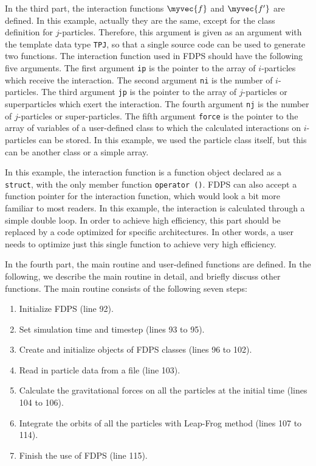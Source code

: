 In the third part, the interaction functions $\myvec{f}$ and
$\myvec{f'}$ are defined. In this example, actually they are the same,
except for the class definition for $j$-particles. Therefore, this
argument is given as an argument with the template data
type \texttt{TPJ}, so that a single source code can be used to
generate two functions.  The interaction function used in FDPS should
have the following five arguments. The first argument \texttt{ip} is
the pointer to the array of $i$-particles which receive the
interaction. The second argument \texttt{ni} is the number of
$i$-particles. The third argument \texttt{jp} is the pointer to the
array of $j$-particles or superparticles which exert the
interaction. The fourth argument \texttt{nj} is the number of
$j$-particles or super-particles. The fifth argument \texttt{force} is
the pointer to the array of variables of a user-defined class to which
the calculated interactions on $i$-particles can be stored. In this
example, we used the particle class itself, but this can be another
class or a simple array.

In this example, the interaction function is a function object
declared as a \texttt{struct}, with the only member
function \texttt{operator ()}. FDPS can also accept a function pointer
for the interaction function, which would look a bit more familiar to
most readers.  In this example, the interaction is calculated through
a simple double loop. In order to achieve high efficiency, this part
should be replaced by a code optimized for specific architectures. In
other words, a user needs to optimize just this single function to
achieve very high efficiency.


In the fourth part, the main routine and user-defined functions are
defined.  In the following, we describe the main routine in detail,
and briefly discuss other functions. The main routine consists of the
following seven steps:
\begin{enumerate}
\item Initialize FDPS (line 92). \label{proc:init}
\item Set simulation time and timestep (lines 93 to 95). \label{proc:literal}
\item Create and initialize objects of FDPS classes (lines 96 to 102). \label{proc:construct}
\item Read in particle data from a file (line 103). \label{proc:input}
\item Calculate the gravitational forces on all the particles at the
  initial time (lines 104 to 106). \label{proc:calcinteraction}
\item Integrate the orbits of all the particles with Leap-Frog method
  (lines 107 to 114). \label{proc:integration}
\item Finish the use of  FDPS (line 115). \label{proc:fin}
\end{enumerate}

